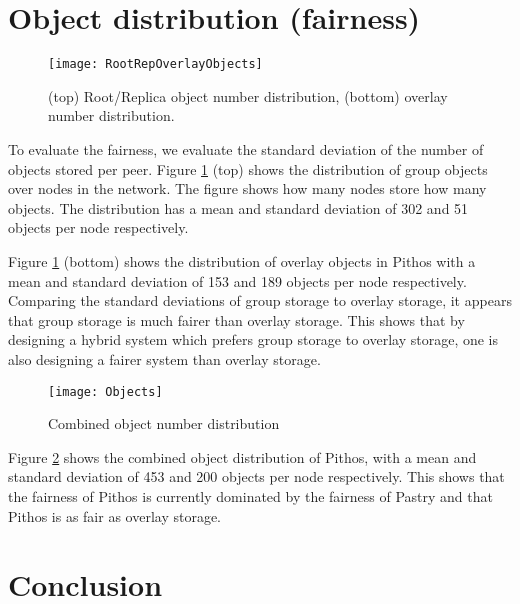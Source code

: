 \section{Object distribution (fairness)}

\begin{figure}[htbp]
 \centering
 \texttt{[image: RootRepOverlayObjects]}
 \caption{(top) Root/Replica object number distribution, (bottom) overlay number distribution.}
 \label{fig_group_overlay_objects}
\end{figure}
%
To evaluate the fairness, we evaluate the standard deviation of the number of objects stored per peer. Figure \ref{fig_group_overlay_objects} (top)
shows the distribution of group objects over nodes in the network. The figure shows how many nodes store how many objects. The distribution has a
mean and standard deviation of 302 and 51 objects per node respectively.

Figure \ref{fig_group_overlay_objects} (bottom) shows the distribution of overlay objects in Pithos with a mean and standard deviation of 153 and 189
objects per node respectively. Comparing the standard deviations of group storage to overlay storage, it appears that group storage is much fairer
than overlay storage. This shows that by designing a hybrid system which prefers group storage to overlay storage, one is also designing a fairer
system than overlay storage.

\begin{figure}[htbp]
 \centering
 \texttt{[image: Objects]}
 \caption{Combined object number distribution}
 \label{fig_objects}
\end{figure}
%
Figure \ref{fig_objects} shows the combined object distribution of Pithos, with a mean and standard deviation of 453 and 200 objects per node
respectively. This shows that the fairness of Pithos is currently dominated by the fairness of Pastry and that Pithos is as fair as overlay storage.

\section{Conclusion}
